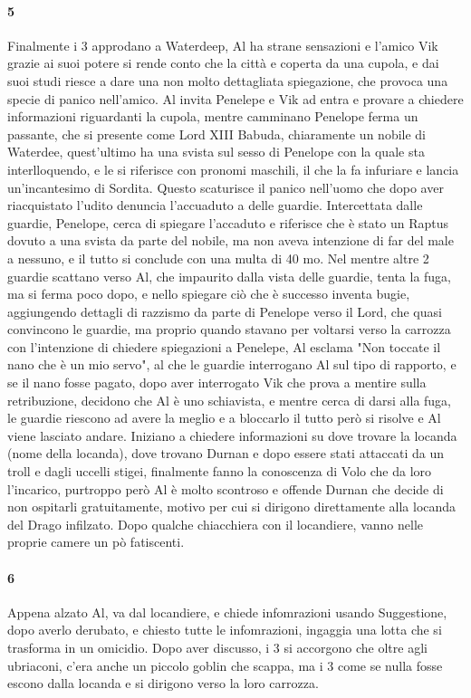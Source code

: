 \documentclass{article}
\begin{document}
                  \paragraph{5} Finalmente i 3 approdano a Waterdeep, Al ha strane sensazioni e l'amico Vik grazie ai suoi potere si rende conto che la città e coperta da una cupola, e dai suoi studi riesce a dare una non molto dettagliata spiegazione, che provoca una specie di panico nell'amico. Al invita Penelepe e Vik ad entra e provare a chiedere informazioni riguardanti la cupola, mentre camminano Penelope ferma un passante, che si presente come Lord XIII Babuda, chiaramente un nobile di Waterdee, quest'ultimo ha una svista sul sesso di Penelope con la quale sta interlloquendo, e le si riferisce con pronomi maschili, il che la fa infuriare e lancia un'incantesimo di Sordita. Questo scaturisce il panico nell'uomo che dopo aver riacquistato l'udito denuncia l'accuaduto a delle guardie. Intercettata dalle guardie, Penelope, cerca di spiegare l'accaduto e riferisce che è stato un Raptus dovuto a una svista da parte del nobile, ma non aveva intenzione di far del male a nessuno, e il tutto si conclude con una multa di 40 mo. Nel mentre altre 2 guardie scattano verso Al, che impaurito dalla vista delle guardie, tenta la fuga, ma si ferma poco dopo, e nello spiegare ciò che è successo inventa bugie, aggiungendo dettagli di razzismo da parte di Penelope verso il Lord,  che quasi convincono le guardie, ma proprio quando stavano per voltarsi verso la carrozza con l'intenzione di chiedere spiegazioni a Penelepe, Al esclama "Non toccate il nano che è un mio servo", al che le guardie interrogano Al sul tipo di rapporto, e se il nano fosse pagato, dopo aver interrogato Vik che prova a mentire sulla retribuzione, decidono che Al è uno schiavista, e mentre cerca di darsi alla fuga, le guardie riescono ad avere la meglio e a bloccarlo il tutto però si risolve e Al viene lasciato andare. Iniziano a chiedere informazioni su dove trovare la locanda (nome della locanda), dove trovano Durnan e dopo essere stati attaccati da un troll e dagli uccelli stigei, finalmente fanno la conoscenza di Volo che da loro l'incarico, purtroppo però Al è molto scontroso e offende Durnan che decide di non ospitarli gratuitamente, motivo per cui si dirigono direttamente alla locanda del Drago infilzato. Dopo qualche chiacchiera con il locandiere, vanno nelle proprie camere un pò fatiscenti. 
                  \paragraph{6} Appena alzato Al, va dal locandiere, e chiede infomrazioni usando Suggestione, dopo averlo derubato, e chiesto tutte le infomrazioni, ingaggia una lotta che si trasforma in un omicidio. Dopo aver discusso, i 3 si accorgono che oltre agli ubriaconi, c'era anche un piccolo goblin che scappa, ma i 3 come se nulla fosse escono dalla locanda e si dirigono verso la loro carrozza.                   
\end{document}
